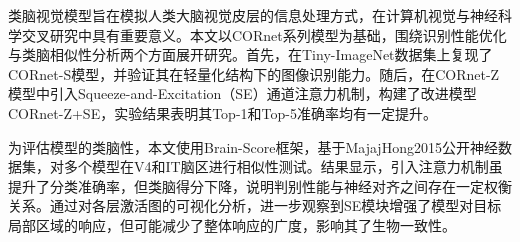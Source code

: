 \begin{abstractzh}

类脑视觉模型旨在模拟人类大脑视觉皮层的信息处理方式，在计算机视觉与神经科学交叉研究中具有重要意义。本文以CORnet系列模型为基础，围绕识别性能优化与类脑相似性分析两个方面展开研究。首先，在Tiny-ImageNet数据集上复现了CORnet-S模型，并验证其在轻量化结构下的图像识别能力。随后，在CORnet-Z模型中引入Squeeze-and-Excitation（SE）通道注意力机制，构建了改进模型CORnet-Z+SE，实验结果表明其Top-1和Top-5准确率均有一定提升。

为评估模型的类脑性，本文使用Brain-Score框架，基于MajajHong2015公开神经数据集，对多个模型在V4和IT脑区进行相似性测试。结果显示，引入注意力机制虽提升了分类准确率，但类脑得分下降，说明判别性能与神经对齐之间存在一定权衡关系。通过对各层激活图的可视化分析，进一步观察到SE模块增强了模型对目标局部区域的响应，但可能减少了整体响应的广度，影响其了生物一致性。


\end{abstractzh}
